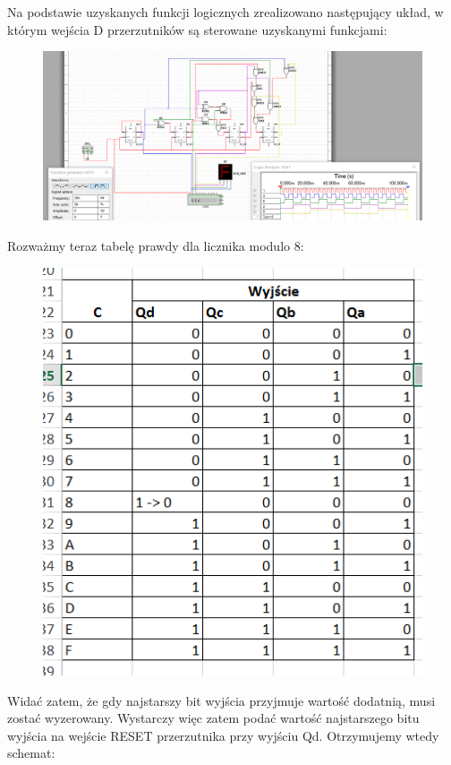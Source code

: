 \documentclass[12pt,a4paper]{article}
\begin{document}
Na podstawie uzyskanych funkcji logicznych zrealizowano następujący układ, w którym wejścia D przerzutników są sterowane uzyskanymi funkcjami:


\begin{figure}[H]
\centering
\includegraphics[width=\textwidth]{img/4c_4bit_mod16}
\end{figure}

Rozważmy teraz tabelę prawdy dla licznika modulo 8:

\begin{figure}[H]
\centering
\includegraphics{img/4c_table_4bit_mod8}
\end{figure}

Widać zatem, że gdy najstarszy bit wyjścia przyjmuje wartość dodatnią, musi zostać wyzerowany. Wystarczy więc zatem podać wartość najstarszego bitu wyjścia na wejście RESET przerzutnika przy wyjściu Qd. Otrzymujemy wtedy schemat:
\end{document}
